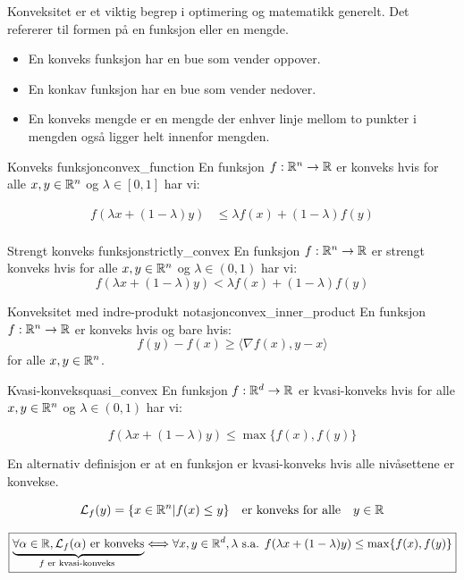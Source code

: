 Konveksitet er et viktig begrep i optimering og matematikk generelt. Det refererer til formen på en funksjon eller en mengde.
\begin{itemize}
	\item En konveks funksjon har en bue som vender oppover.
	\item En konkav funksjon har en bue som vender nedover.
	\item En konveks mengde er en mengde der enhver linje mellom to punkter i mengden også ligger helt innenfor mengden.
\end{itemize}

\begin{definition}{Konveks funksjon}{convex_function}
	En funksjon \(f: \mathbb{R}^n \to \mathbb{R}\) er konveks hvis for alle \(x, y \in \mathbb{R}^n\) og \(\lambda \in [0, 1]\) har vi:

	\begin{align*}
		f(\lambda x + (1 - \lambda)y) & \leq \lambda f(x) + (1 - \lambda)f(y) \\
	\end{align*}
\end{definition}

\begin{definition}{Strengt konveks funksjon}{strictly_convex}
	En funksjon \(f: \mathbb{R}^n \to \mathbb{R}\) er strengt konveks hvis for alle \(x, y \in \mathbb{R}^n\) og \(\lambda \in (0, 1)\) har vi:
	\[
		f(\lambda x + (1 - \lambda)y) < \lambda f(x) + (1 - \lambda)f(y)
	\]
\end{definition}

\begin{remark}{Konveksitet med indre-produkt notasjon}{convex_inner_product}
	En funksjon  \(f: \mathbb{R}^n \to \mathbb{R}\) er konveks hvis og bare hvis:
	\[
		f(y) - f(x) \geq  \langle \nabla f(x), y - x \rangle
	\]
	for alle  \(x, y \in \mathbb{R}^n\).
\end{remark}


\begin{remark}{Kvasi-konveks}{quasi_convex}
	En funksjon \(f: \mathbb{R}^d \to \mathbb{R}\) er kvasi-konveks hvis for alle \(x, y \in \mathbb{R}^n\) og \(\lambda \in (0, 1)\) har vi:

	\[
		f(\lambda x + (1 - \lambda)y) \leq \max\{f(x), f(y)\}
	\]

	En alternativ definisjon er at en funksjon er kvasi-konveks hvis alle nivåsettene er konvekse.

	\[
		\mathcal{L}_f(y) = \{x \in \mathbb{R}^n | f(x) \leq y\} \quad \text{er konveks for alle} \quad y \in \mathbb{R}
	\]

	\[
		\boxed{\underbrace{\forall \alpha \in \mathbb{R}, \mathcal{L}_f(\alpha) \text{ er konveks}}_{f \text{ er kvasi-konveks }}\Longleftrightarrow \forall x, y \in \mathbb{R}^d,\lambda \text{ s.a. } f(\lambda x + (1-\lambda)y) \leq \max \{ f(x), f(y) \}}
	\]
\end{remark}

